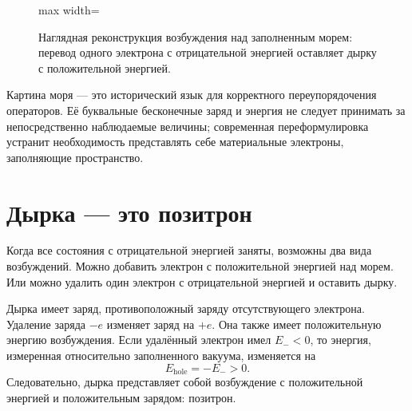 \begin{figure}[htbp]
\centering
\begin{adjustbox}{max width=\linewidth}
\end{adjustbox}
\caption{Наглядная реконструкция возбуждения над заполненным морем: перевод одного электрона с отрицательной энергией оставляет дырку с положительной энергией.}
\end{figure}

Картина моря — это исторический язык для корректного переупорядочения операторов. Её буквальные бесконечные заряд и энергия не следует принимать за непосредственно наблюдаемые величины; современная переформулировка устранит необходимость представлять себе материальные электроны, заполняющие пространство.

\section{Дырка — это позитрон}

Когда все состояния с отрицательной энергией заняты, возможны два вида возбуждений. Можно добавить электрон с положительной энергией над морем. Или можно удалить один электрон с отрицательной энергией и оставить дырку.

Дырка имеет заряд, противоположный заряду отсутствующего электрона. Удаление заряда \(-e\) изменяет заряд на \(+e\). Она также имеет положительную энергию возбуждения. Если удалённый электрон имел \(E_-<0\), то энергия, измеренная относительно заполненного вакуума, изменяется на
\begin{equation}
E_{\mathrm{hole}}=-E_->0.
\end{equation}
Следовательно, дырка представляет собой возбуждение с положительной энергией и положительным зарядом: позитрон.

